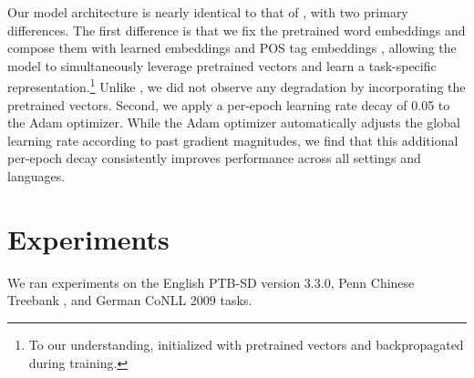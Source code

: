 \documentclass[11pt,letterpaper]{article}
\newcommand{\ignore}[1]{}
\newcommand{\lingpengcomment}[1]{\ignore{\textcolor{green}{{\textbf{[#1 --\textsc{lpk}]}}}}}
\newcommand{\cjd}[1]{\textcolor{cyan}{\ignore{{\textbf{[#1 --\textsc{cjd}]}}}}}
\newcommand{\nascomment}[1]{\ignore{\textcolor{blue}{{\textbf{[#1 --\textsc{nas}]}}}}}
\newcommand{\miguelcomment}[1]{\ignore{\textcolor{red}{{\textbf{[#1 --\textsc{miguel}]}}}}}
\begin{document}
Our model architecture is nearly identical to that of , with two primary differences. The first difference is that we fix the pretrained word embeddings and compose them with  learned embeddings and  POS tag embeddings \cite{stack_lstm}, allowing the model to simultaneously leverage pretrained vectors and learn a task-specific representation.\footnote{To our understanding,  initialized with pretrained vectors and backpropagated during training.} Unlike , we did not observe any degradation by incorporating the pretrained vectors. Second, we apply a per-epoch learning rate decay of 0.05 to the Adam optimizer. While the Adam optimizer automatically adjusts the global learning rate according to past gradient magnitudes, we find that this additional per-epoch decay consistently improves performance across all settings and languages.  \ignore{First, we concatenate pretrained word embeddings (kept fixed during training) with word embeddings learned from scratch and part-of-speech tag embeddings, followed by a rectifier non-linearity, to obtain the word representation fed into the bidirectional LSTM \cite{stack_lstm}. This approach allows the model to use pretrained vectors while simultaneously learning a representation suitable for parsing.  We understand \newcite{kiperwasser} to have used the pretrained word embedding to initialize the word vectors and backpropagate during training. Unlike \newcite{kiperwasser}, we did not observe any degradation in performance when incorporating pretrained word embeddings to our model. Second, we incorporate a per-epoch decay to the Adam optimizer \cite{adam}, which is beneficial to model performance under all settings.  \nascomment{what did Kiperwaser do (why is this framed as a second difference?  don't assume the reader knows every detail of that paper}\cjd{the details about word embeddings seem a bit complicated. i think we should just be precise in what we did, and say that this is very close to their model}\lingpengcomment{second thing we can juse say in experiment section we use adam, and the first thing seems not that important to me too. this is the way the stack-lstm do the input right? probably just say we construct the input same as that? say we build a model very close to kiperwasser is probably enough?}} 




\section{Experiments}\label{sec:exp}
We ran experiments on the English PTB-SD version 3.3.0, Penn Chinese Treebank \cite{ctb}, and German CoNLL 2009 \cite{conll2009} tasks. \ignore{\miguelcomment{why do you cite ptb and conll, but you don't the ctb treebank? you already cited PTB-SD above}}
\end{document}
